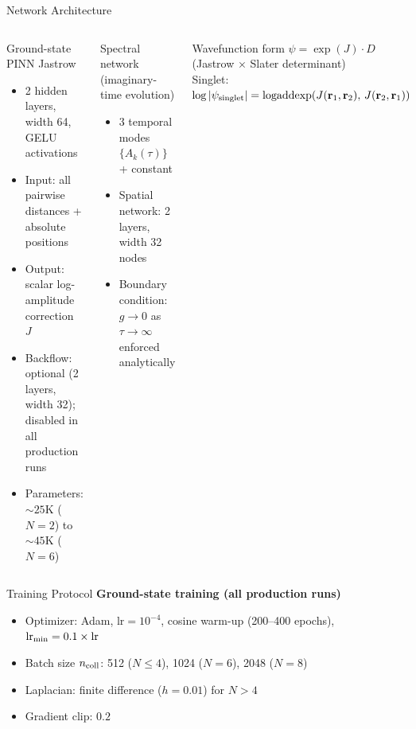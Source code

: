 \documentclass[aspectratio=169,10pt]{beamer}
\begin{document}
\begin{frame}{Network Architecture}
  \begin{columns}[T]
      \begin{block}{Ground-state PINN Jastrow}
        \begin{itemize}
          \item 2 hidden layers, width 64, GELU activations
          \item Input: all pairwise distances + absolute positions
          \item Output: scalar log-amplitude correction $J$
          \item Backflow: optional (2 layers, width 32);
                \alert{disabled} in all production runs
          \item Parameters: ${\sim}25$K ($N=2$) to ${\sim}45$K ($N=6$)
        \end{itemize}
      \end{block}
      \begin{block}{Spectral network (imaginary-time evolution)}
        \begin{itemize}
          \item 3 temporal modes $\{A_k(\tau)\}$ + constant
          \item Spatial network: 2 layers, width 32 nodes
          \item Boundary condition: $g \to 0$ as $\tau\to\infty$
                enforced analytically
        \end{itemize}
      \end{block}
      \vspace{0.2cm}
      \begin{alertblock}{Wavefunction form}
        $\psi = \exp(J)\cdot D$ \quad (Jastrow $\times$ Slater determinant)\\[3pt]
        Singlet: $\log|\psi_{\rm singlet}| =
          \mathrm{logaddexp}(J(\mathbf{r}_1,\mathbf{r}_2),\,J(\mathbf{r}_2,\mathbf{r}_1))$
      \end{alertblock}
  \end{columns}
\end{frame}

\begin{frame}{Training Protocol}
      \textbf{Ground-state training (all production runs)}
      \begin{itemize}
        \item Optimizer: Adam, $\text{lr}=10^{-4}$, cosine warm-up
              (200--400 epochs), $\text{lr}_{\rm min}=0.1\times\text{lr}$
        \item Batch size $n_{\rm coll}$: 512 ($N\leq4$), 1024 ($N=6$),
              2048 ($N=8$)
        \item Laplacian: finite difference ($h=0.01$) for $N>4$
        \item Gradient clip: $0.2$
      \end{itemize}
\end{frame}
\end{document}
